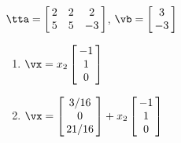 {$\tta = \left[\hskip -3pt \begin{array}{ccc} 2&2&2\\  5&5&-3
\end{array}\hskip -3pt \right]  $, $\vb=\left[\hskip -3pt \begin{array}{c} 3\\  -3\end{array}\hskip -3pt \right] $}
{\begin{enumerate}
\item	 $\vx=x_2\left[\hskip -3pt \begin{array}{c} -1\\  1\\  0\end{array}\hskip -3pt \right]$
\item	 $\vx=\left[\hskip -3pt \begin{array}{c} 3/16\\  0\\  {21/16}\end {array} \hskip -3pt
\right]+x_2\left[\hskip -3pt \begin{array}{c} -1\\  1\\  0\end{array}\hskip -3pt \right]$
\end{enumerate}}

 






